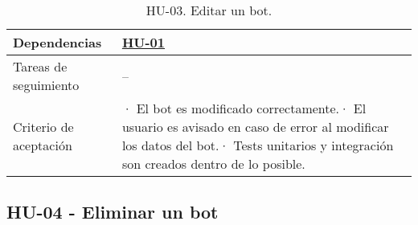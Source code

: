 \begin{table}[H]
\begin{adjustbox}{max width=\textwidth}
\begin{tabularx}{\textwidth}{|l|L|}
        Dependencias & \hyperref[sec:hu01]{HU-01} \\ \hline
        Tareas de seguimiento & – \\ \hline
        Criterio de aceptación & · El bot es modificado correctamente.\linebreak · El usuario es avisado en caso de error al modificar los datos del bot.\linebreak · Tests unitarios y integración son creados dentro de lo posible. \\ \hline
    \end{tabularx}
    \end{adjustbox}
    \caption{HU-03. Editar un bot.}
\end{table}

\subsection{HU-04 - Eliminar un bot}
\label{sec:hu04}

